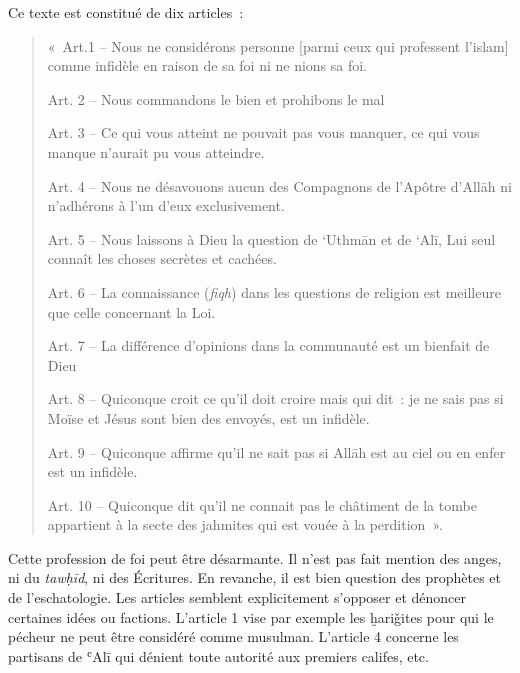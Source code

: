 Ce texte est constitué de dix articles~:

\begin{quote}
«~Art.1 -- Nous ne considérons personne {[}parmi ceux qui professent
l'islam{]} comme infidèle en raison de sa foi ni ne nions sa foi.

Art. 2 -- Nous commandons le bien et prohibons le mal

Art. 3 -- Ce qui vous atteint ne pouvait pas vous manquer, ce qui vous
manque n'aurait pu vous atteindre.

Art. 4 -- Nous ne désavouons aucun des Compagnons de l'Apôtre d'Allāh ni
n'adhérons à l'un d'eux exclusivement.

Art. 5 -- Nous laissons à Dieu la question de `Uthmān et de `Alī, Lui
seul connaît les choses secrètes et cachées.

Art. 6 -- La connaissance (\emph{fiqh}) dans les questions de religion
est meilleure que celle concernant la Loi.

Art. 7 -- La différence d'opinions dans la communauté est un bienfait de
Dieu

Art. 8 -- Quiconque croit ce qu'il doit croire mais qui dit~: je ne sais
pas si Moïse et Jésus sont bien des envoyés, est un infidèle.

Art. 9 -- Quiconque affirme qu'il ne sait pas si Allāh est au ciel ou en
enfer est un infidèle.

Art. 10 -- Quiconque dit qu'il ne connait pas le châtiment de la tombe
appartient à la secte des jahmites qui est vouée à la perdition~».
\end{quote}
Cette profession de foi peut être désarmante. Il n'est pas fait mention
des anges, ni du \emph{tawḥīd}, ni des Écritures. En revanche, il est
bien question des prophètes et de l'eschatologie. Les articles semblent
explicitement s'opposer et dénoncer certaines idées ou factions.
L'article 1 vise par exemple les ḫariǧites pour qui le pécheur ne peut
être considéré comme musulman. L'article 4 concerne les partisans de
ʿAlī qui dénient toute autorité aux premiers califes, etc.

